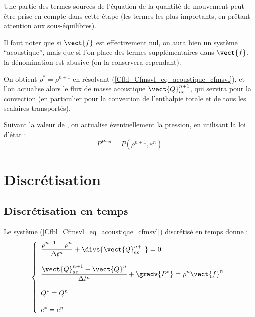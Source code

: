 Une partie des termes sources de l'équation de la
quantité de mouvement peut être prise en compte dans cette étape
(les termes les plus importants, en prêtant attention aux sous-équilibres).

Il faut noter que si $\vect{f}$ est effectivement nul, on aura bien un
système ``acoustique'', mais que si l'on place des termes supplémentaires
dans $\vect{f}$, la dénomination est abusive (on la conservera cependant).

On obtient $\rho^* = \rho^{n+1}$ en résolvant (\ref{Cfbl_Cfmsvl_eq_acoustique_cfmsvl}),
et l'on actualise alors le flux de masse acoustique $\vect{Q}_{ac}^{n+1}$,
qui servira pour la convection (en particulier pour la convection de
l'enthalpie totale et de tous les scalaires transportés).

Suivant la valeur de , on actualise éventuellement la pression, en
utilisant la loi d'état :
$$
\displaystyle P^{Pred}=P(\rho^{n+1},\varepsilon^{n})
$$

\section*{Discrétisation}
\subsection*{Discrétisation en temps}

Le système (\ref{Cfbl_Cfmsvl_eq_acoustique_cfmsvl}) discrétisé en temps donne :
\begin{equation}\label{Cfbl_Cfmsvl_eq_acoustique_discrete_cfmsvl}
\left\{\begin{array}{l}

\displaystyle\frac{\rho^{n+1}-\rho^n}{\Delta t^n}
+ \divs{\vect{Q}_{ac}^{n+1}} = 0 \\
\\
\displaystyle\frac{\vect{Q}_{ac}^{n+1}-\vect{Q}^n}{\Delta t^n}+\gradv{P^*} =
\rho^n \vect{f}^n\\
\\
Q^*=Q^n\\
\\
e^*=e^n\\

\end{array}\right.
\end{equation}

